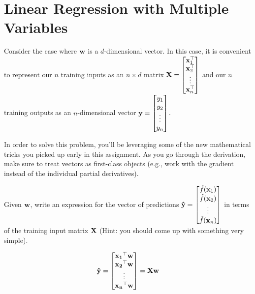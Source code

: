 \documentclass[assignment02_Solutions]{subfiles}
\begin{document}
\begin{exercise}[(25 minutes)]
\begin{boxedsolution}
\end{boxedsolution}

\end{exercise}

\section{Linear Regression with Multiple Variables}
\begin{exercise}[(40 minutes)]
Consider the case where $\mathbf{w}$ is a $d$-dimensional vector.  In this case, it is convenient to represent our $n$ training inputs as an $n \times d$ matrix $\mathbf{X} = \begin{bmatrix} \mathbf{x}_1^\top \\ \mathbf{x}_2^\top \\ \vdots \\ \mathbf{x}_n^\top \end{bmatrix}$ and our $n$ training outputs as an $n$-dimensional vector $\mathbf{y} = \begin{bmatrix} y_1 \\ y_2 \\ \vdots \\ y_n \end{bmatrix}$.

In order to solve this problem, you'll be leveraging some of the new mathematical tricks you picked up early in this assignment.  As you go through the derivation, make sure to treat vectors as first-class objects (e.g., work with the gradient instead of the individual partial derivatives).
\bes

\item Given $\mathbf{w}$, write an expression for the vector of predictions $\mathbf{\hat{y}} = \begin{bmatrix} \hat{f}(\mathbf{x}_1) \\  \hat{f}(\mathbf{x}_2) \\  \vdots \\  \hat{f}(\mathbf{x}_n)\end{bmatrix}$ in terms of the training input matrix $\mathbf{X}$ (Hint: you should come up with something very simple).

\begin{boxedsolution}
$$\mathbf{\hat{y}} = \begin{bmatrix} \mathbf{x_1}^\top  \mathbf{w} \\ \mathbf{x_2}^\top \mathbf{w} \\ \vdots \\ \mathbf{x_n}^\top \mathbf{w} \end{bmatrix} = \mathbf{X} \mathbf{w}$$
\end{boxedsolution}


\end{exercise}
\end{document}
